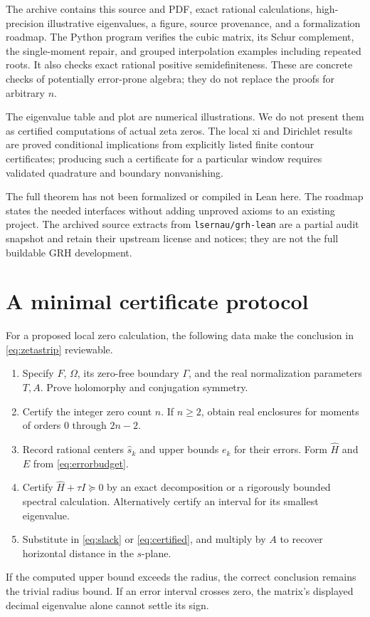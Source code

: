 \documentclass[11pt]{article}
\theoremstyle{definition}
\newcommand{\repo}{\texttt{lsernau/grh-lean}}
\begin{document}
The archive contains this source and PDF, exact rational calculations,
high-precision illustrative eigenvalues, a figure, source provenance, and a
formalization roadmap. The Python program verifies the cubic matrix,
its Schur complement, the single-moment repair, and grouped interpolation
examples including repeated roots. It also checks exact rational positive
semidefiniteness. These are concrete checks of potentially error-prone
algebra; they do not replace the proofs for arbitrary $n$.

The eigenvalue table and plot are numerical illustrations. We do not present
them as certified computations of actual zeta zeros. The local xi and
Dirichlet results are proved conditional implications from explicitly
listed finite contour certificates; producing such a certificate for a
particular window requires validated quadrature and boundary nonvanishing.

The full theorem has not been formalized or compiled in Lean here. The
roadmap states the needed interfaces without adding unproved axioms to an
existing project. The archived source extracts from \repo{} are a partial
audit snapshot and retain their upstream license and notices; they are not
the full buildable GRH development.

\appendix
\section{A minimal certificate protocol}

For a proposed local zero calculation, the following data make the
conclusion in \eqref{eq:zetastrip} reviewable.
\begin{enumerate}
\item Specify $F$, $\Omega$, its zero-free boundary $\Gamma$, and the real
normalization parameters $T,A$. Prove holomorphy and conjugation symmetry.
\item Certify the integer zero count $n$. If $n\geq2$, obtain real
enclosures for moments of orders $0$ through $2n-2$.
\item Record rational centers $\widehat s_k$ and upper bounds $e_k$ for
their errors. Form $\widehat H$ and $E$ from \eqref{eq:errorbudget}.
\item Certify $\widehat H+\tau I\succeq0$ by an exact decomposition or
a rigorously bounded spectral calculation. Alternatively certify an
interval for its smallest eigenvalue.
\item Substitute in \eqref{eq:slack} or \eqref{eq:certified}, and multiply
by $A$ to recover horizontal distance in the $s$-plane.
\end{enumerate}
If the computed upper bound exceeds the radius, the correct conclusion
remains the trivial radius bound. If an error interval crosses zero, the
matrix's displayed decimal eigenvalue alone cannot settle its sign.
\end{document}
